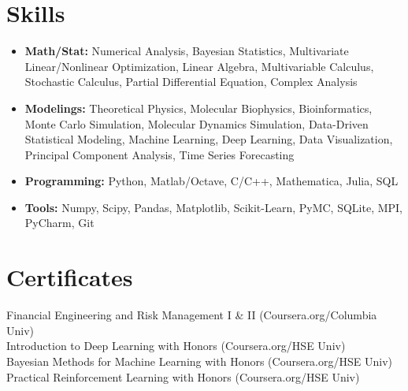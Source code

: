 \documentclass[11pt]{../yhlcv}
\begin{document}
\section*{Skills}
\begin{itemize}[leftmargin=*]\itemsep-0.1em
%
\item {\bf Math/Stat:}
Numerical Analysis, 
Bayesian Statistics, 
Multivariate Linear/Nonlinear Optimization, 
Linear Algebra, 
Multivariable Calculus,
Stochastic Calculus,
Partial Differential Equation, 
Complex Analysis %
\item{\bf Modelings:}
Theoretical Physics, Molecular Biophysics, Bioinformatics,
Monte Carlo Simulation, Molecular Dynamics Simulation, %
Data-Driven Statistical Modeling,
Machine Learning,
Deep Learning, %
Data Visualization, 
Principal Component Analysis, 
Time Series Forecasting
%
\item{\bf Programming:} 
Python, Matlab/Octave, C/C++, Mathematica, Julia, SQL
%
\item{\bf Tools:}
Numpy, Scipy, Pandas, Matplotlib, Scikit-Learn, PyMC, SQLite, MPI, PyCharm, Git
\end{itemize}




\section*{Certificates}

Financial Engineering and Risk Management I \& II (Coursera.org/Columbia Univ)  \\
Introduction to Deep Learning with Honors (Coursera.org/HSE Univ) \\
Bayesian Methods for Machine Learning with Honors (Coursera.org/HSE Univ)   \\
Practical Reinforcement Learning with Honors (Coursera.org/HSE Univ)  \\
\end{document}
